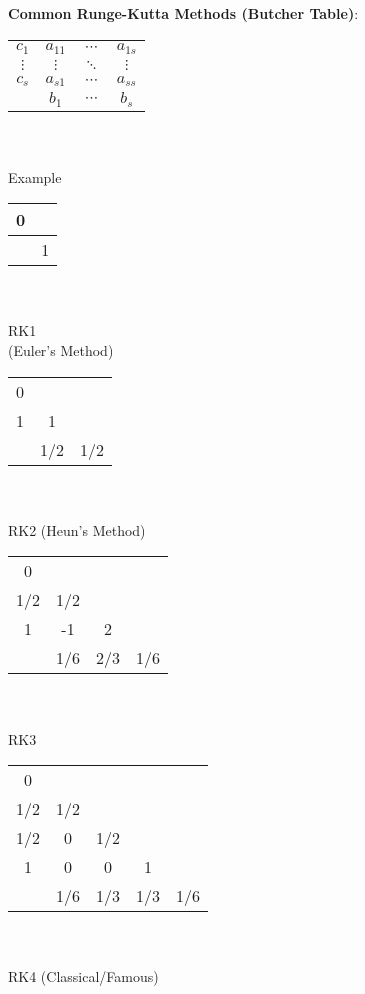 \documentclass[9pt]{article}
\begin{document}
\textbf{Common Runge-Kutta Methods (Butcher Table)}:

\vspace{-5pt}
\begin{minipage}{0.15\linewidth}
    \centering
    \begin{tabular}{c|ccc}
        $c_1$ & $a_{11}$ & $\cdots$ & $a_{1s}$ \\
        $\vdots$ & $\vdots$ & $\ddots$ & $\vdots$ \\
        $c_s$ & $a_{s1}$ & $\cdots$ & $a_{ss}$ \\
        \hline
            & $b_1$ & $\cdots$ & $b_s$
    \end{tabular}
    \\~\\
    \scriptsize{Example}
\end{minipage}
\hfill
\begin{minipage}{0.15\linewidth}
    \centering
    \begin{tabular}{c|c}
        0 &  \\
        \hline
          & 1
    \end{tabular}
    \\~\\
    \scriptsize{RK1 \\ (Euler's Method)}
\end{minipage}
\hfill
\begin{minipage}{0.15\linewidth}
    \centering
    \begin{tabular}{c|cc}
        0   &    &  \\
        1   & 1   &  \\
        \hline
            & 1/2 & 1/2
    \end{tabular}
    \\~\\
    \scriptsize{RK2 (Heun's Method)}
\end{minipage}
\hfill
\begin{minipage}{0.2\linewidth}
    \centering
    \begin{tabular}{c|ccc}
        0   &    &    &  \\
        1/2 & 1/2 &    &  \\
        1   & -1  & 2   &  \\
        \hline
            & 1/6 & 2/3 & 1/6
    \end{tabular}
    \\~\\
    \scriptsize{RK3}
\end{minipage}
\hfill
\begin{minipage}{0.3\linewidth}
    \centering
    \begin{tabular}{c|cccc}
        0   &    &    &    &  \\
        1/2 & 1/2 &    &    &  \\
        1/2 & 0   & 1/2 &    &  \\
        1   & 0   & 0   & 1   &  \\
        \hline
            & 1/6 & 1/3 & 1/3 & 1/6
    \end{tabular}
    \\~\\
    \scriptsize{RK4 (Classical/Famous)}
\end{minipage}
\end{document}
